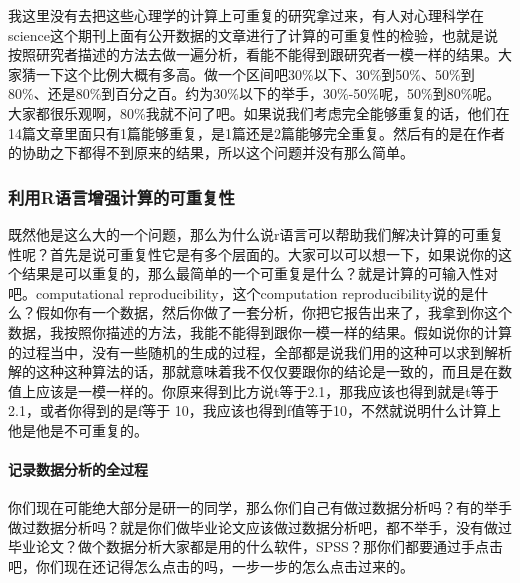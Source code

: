 \documentclass[
  oneside]{book}
\begin{document}
我这里没有去把这些心理学的计算上可重复的研究拿过来，有人对心理科学在science这个期刊上面有公开数据的文章进行了计算的可重复性的检验，也就是说按照研究者描述的方法去做一遍分析，看能不能得到跟研究者一模一样的结果。大家猜一下这个比例大概有多高。做一个区间吧30\%以下、30\%到50\%、50\%到80\%、还是80\%到百分之百。约为30\%以下的举手，30\%-50\%呢，50\%到80\%呢。大家都很乐观啊，80\%我就不问了吧。如果说我们考虑完全能够重复的话，他们在14篇文章里面只有1篇能够重复，是1篇还是2篇能够完全重复。然后有的是在作者的协助之下都得不到原来的结果，所以这个问题并没有那么简单。

\hypertarget{ux5229ux7528rux8bedux8a00ux589eux5f3aux8ba1ux7b97ux7684ux53efux91cdux590dux6027}{%
\subsubsection{利用R语言增强计算的可重复性}\label{ux5229ux7528rux8bedux8a00ux589eux5f3aux8ba1ux7b97ux7684ux53efux91cdux590dux6027}}

既然他是这么大的一个问题，那么为什么说r语言可以帮助我们解决计算的可重复性呢？首先是说可重复性它是有多个层面的。大家可以可以想一下，如果说你的这个结果是可以重复的，那么最简单的一个可重复是什么？就是计算的可输入性对吧。computational
reproducibility，这个computation
reproducibility说的是什么？假如你有一个数据，然后你做了一套分析，你把它报告出来了，我拿到你这个数据，我按照你描述的方法，我能不能得到跟你一模一样的结果。假如说你的计算的过程当中，没有一些随机的生成的过程，全部都是说我们用的这种可以求到解析解的这种这种算法的话，那就意味着我不仅仅要跟你的结论是一致的，而且是在数值上应该是一模一样的。你原来得到比方说t等于2.1，那我应该也得到就是t等于2.1，或者你得到的是f等于
10，我应该也得到f值等于10，不然就说明什么计算上他是他是不可重复的。

\hypertarget{ux8bb0ux5f55ux6570ux636eux5206ux6790ux7684ux5168ux8fc7ux7a0b}{%
\paragraph{\texorpdfstring{\textbf{记录数据分析的全过程}}{记录数据分析的全过程}}\label{ux8bb0ux5f55ux6570ux636eux5206ux6790ux7684ux5168ux8fc7ux7a0b}}

你们现在可能绝大部分是研一的同学，那么你们自己有做过数据分析吗？有的举手做过数据分析吗？就是你们做毕业论文应该做过数据分析吧，都不举手，没有做过毕业论文？做个数据分析大家都是用的什么软件，SPSS？那你们都要通过手点击吧，你们现在还记得怎么点击的吗，一步一步的怎么点击过来的。
\end{document}
